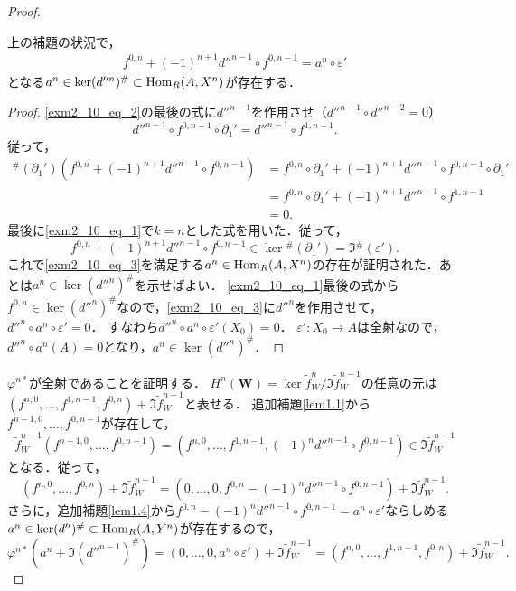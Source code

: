 \begin{proof}
  \begin{lem}\label{lem1.4}
    上の補題の状況で，
    \begin{align}
      f^{0, n} + (-1)^{n+1} d''^{n-1} \circ f^{0, n-1} = a^n \circ \varepsilon' \label{exm2_10_eq_3}
    \end{align}
    となる$a^n \in \ker (d''^n)^\# \subset \operatorname{Hom}_R(A, X^n)$が存在する．
  \end{lem}
  \begin{proof}
    \eqref{exm2_10_eq_2}の最後の式に$d''^{n-1}$を作用させ（$d''^{n-1} \circ d''^{n-2} = 0$）
    \[ d''^{n-1} \circ f^{0, n-1} \circ \partial_1' = d''^{n-1} \circ f^{1, n-1}.\]
    従って，
    \begin{align*}
      ^\#(\partial_1') (f^{0, n} + (-1)^{n+1} d''^{n-1} \circ f^{0, n-1} ) & = f^{0, n} \circ \partial_1' + (-1)^{n+1} d''^{n-1} \circ f^{0, n-1}  \circ \partial_1' \\
      & = f^{0, n} \circ \partial_1' + (-1)^{n+1} d''^{n-1} \circ f^{1, n-1} \\
      & = 0.
    \end{align*}
    最後に\eqref{exm2_10_eq_1}で$k=n$とした式を用いた．従って，
    \[ f^{0, n} + (-1)^{n+1} d''^{n-1} \circ f^{0, n-1} \in \ker {}^\#(\partial_1') = \Im {}^\#(\varepsilon'). \]
    これで\eqref{exm2_10_eq_3}を満足する$a^n \in \operatorname{Hom}_R(A, X^n)$の存在が証明された．あとは$a^n \in \ker (d''^n)^\#$を示せばよい．
    \eqref{exm2_10_eq_1}最後の式から$f^{0, n} \in \ker (d''^n)^\#$なので，\eqref{exm2_10_eq_3}に$d''^n$を作用させて，$d''^n \circ a^n \circ \varepsilon' = 0$．
    すなわち$d''^n \circ a^n \circ \varepsilon'(X_0) = 0$．
    $\varepsilon'\colon X_0 \to A$は全射なので，$d''^n \circ a^n (A) = 0$となり，$a^n \in \ker (d''^n)^\#$．
  \end{proof}

  $\varphi^{n\ast}$が全射であることを証明する．
  $H^n(\boldsymbol{W}) = \ker \tilde{f}_W^n / \Im \tilde{f}_W^{n-1}$の任意の元は$(f^{n, 0}, \ldots, f^{1, n-1}, f^{0,n}) + \Im \tilde{f}_W^{n-1}$と表せる．
  追加補題\ref{lem1.1}から$f^{n-1, 0}, \ldots, f^{0, n-1}$が存在して，
  \[ \tilde{f}_W^{n-1}(f^{n-1, 0}, \ldots, f^{0, n-1}) = (f^{n, 0}, \ldots, f^{1, n-1}, (-1)^n d''^{n-1} \circ f^{0, n-1}) \in \Im \tilde{f}_W^{n-1}\]
  となる．従って，
  \[ (f^{n, 0}, \ldots, f^{0,n}) + \Im \tilde{f}_W^{n-1} = (0, \ldots, 0, f^{0, n} - (-1)^n d''^{n-1} \circ f^{0, n-1}) + \Im \tilde{f}_W^{n-1}. \]
  さらに，追加補題\ref{lem1.4}から$f^{0, n} - (-1)^n d''^{n-1} \circ f^{0, n-1} = a^n \circ \varepsilon'$ならしめる$a^n \in \ker (d'')^\# \subset \operatorname{Hom}_R(A, Y^n)$が存在するので，
  \[ \varphi^{n\ast}(a^n + \Im (d''^{n-1})^\#) = (0, \ldots, 0, a^n \circ \varepsilon') + \Im \tilde{f}_W^{n-1} = (f^{n, 0}, \ldots, f^{1, n-1}, f^{0,n}) + \Im \tilde{f}_W^{n-1}. \]


\end{proof}
